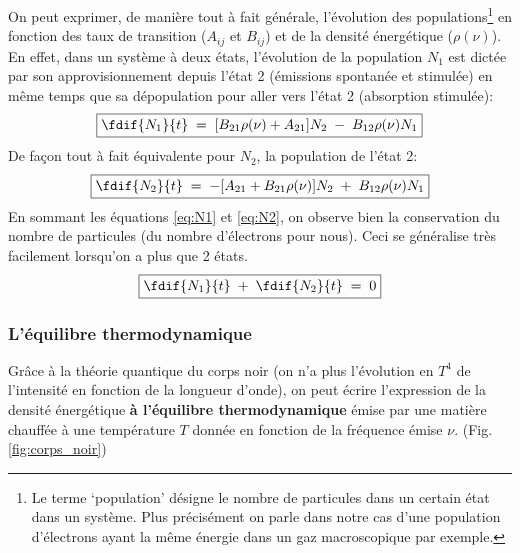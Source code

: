 On peut exprimer, de manière tout à fait générale, l'évolution des populations\footnote{Le terme `population' désigne le nombre de particules dans un certain état dans un système. Plus précisément on parle dans notre cas d'une population d'électrons ayant la même énergie dans un gaz macroscopique par exemple.} en fonction des taux de transition ($A_{ij}$ et $B_{ij}$) et de la densité énergétique ($\rho(\nu)$).\\
En effet, dans un système à deux états, l'évolution de la population $N_1$ est dictée par son approvisionnement depuis l'état 2 (émissions spontanée et stimulée) en même temps que sa dépopulation pour aller vers l'état 2 (absorption stimulée):
\begin{equation}
\boxed{
    \fdif{N_1}{t}
    \eq  [B_{21}\rho(\nu) + A_{21}]N_2 \;-\; B_{12} \rho(\nu)N_1
    }
    \label{eq:N2}
\end{equation}
De façon tout à fait équivalente pour $N_2$, la population de l'état 2:
\begin{equation}
\boxed{
    \fdif{N_2}{t}
    \eq - [A_{21} + B_{21} \rho(\nu)]N_2 \;+\; B_{12}\rho(\nu)N_1
    \label{eq:N1}
    }
\end{equation}
En sommant les équations \ref{eq:N1} et \ref{eq:N2}, on observe bien la conservation du nombre de particules (du nombre d'électrons pour nous). Ceci se généralise très facilement lorsqu'on a plus que 2 états.
\begin{equation}
\boxed{
    \fdif{N_1}{t}\;+\;\fdif{N_2}{t} \eq 0
    }
\end{equation}



\subsubsection{L'équilibre thermodynamique}



Grâce à la théorie quantique du corps noir (on n'a plus l'évolution en $T^4$ de l'intensité en fonction de la longueur d'onde), on peut écrire l'expression de la densité énergétique \textbf{à l'équilibre thermodynamique} émise par une matière chauffée à une température $T$ donnée en fonction de la fréquence émise $\nu$. (Fig. \ref{fig:corps_noir})

